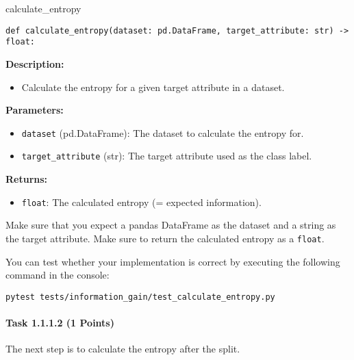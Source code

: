\documentclass[
english,
smallborders
]{i6prcsht}
\newcommand{\points}[1]{\hfill \color{red}(#1 Points)\color{black}}
\begin{document}
\begin{functionbox}{calculate\_entropy}
	\begin{lstlisting}[numbers=none]
def calculate_entropy(dataset: pd.DataFrame, target_attribute: str) -> float:
\end{lstlisting}
	
	\textbf{Description:}
	\begin{itemize}[leftmargin=*,topsep=0pt]
		\item Calculate the entropy for a given target attribute in a dataset.
	\end{itemize}
	
	\textbf{Parameters:}
	\begin{itemize}[leftmargin=*,topsep=0pt]
		\item \texttt{dataset} (pd.DataFrame): The dataset to calculate the entropy for.
		\item \texttt{target\_attribute} (str): The target attribute used as the class label.
	\end{itemize}
	
	\textbf{Returns:}
	\begin{itemize}[leftmargin=*,topsep=0pt]
		\item \texttt{float}: The calculated entropy (= expected information).
	\end{itemize}
\end{functionbox}

\vspace*{0.5cm}

Make sure that you expect a pandas DataFrame as the dataset and a string as the target attribute. Make sure to return the calculated entropy as a \texttt{float}.

You can test whether your implementation is correct by executing the following command in the console:

\vspace*{0.3cm}

\begin{lstlisting}
pytest tests/information_gain/test_calculate_entropy.py
\end{lstlisting}

\newpage

\paragraph*{Task 1.1.1.2 \points{1}} \hfill

The next step is to calculate the entropy after the split.
\end{document}
